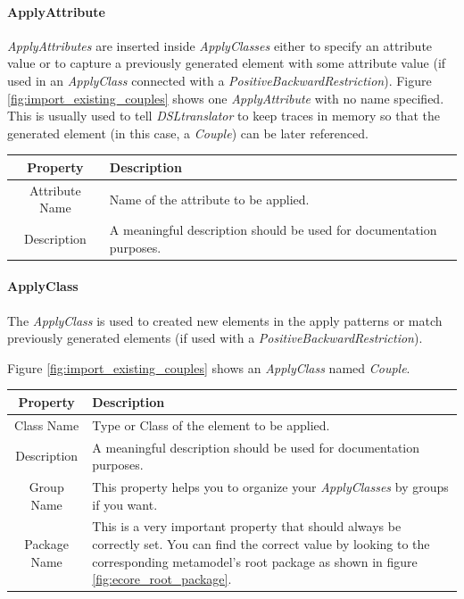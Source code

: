 \paragraph{ApplyAttribute}

\emph{ApplyAttributes} are inserted inside \emph{ApplyClasses} either to specify
an attribute value or to capture a previously generated element with some attribute
value (if used in an \emph{ApplyClass} connected with a
\emph{PositiveBackwardRestriction}). Figure \ref{fig:import_existing_couples}
shows one \emph{ApplyAttribute} with no name specified. This is usually used to
tell \emph{DSLtranslator} to keep traces in memory so that the generated element
(in this case, a \emph{Couple}) can be later referenced.

\begin{center}
  \begin{tabular}{ | c | p{\paragraphsize} | }
    \hline
    \textbf{Property} & \textbf{Description} \\ \hline
    Attribute Name & Name of the attribute to be applied.  \\ \hline
    Description & A meaningful description should be used for documentation
  purposes. \\ \hline
  \end{tabular}
\end{center}


\paragraph{ApplyClass}

The \emph{ApplyClass} is used to created new elements in the apply patterns or
match previously generated elements (if used with a
\emph{PositiveBackwardRestriction}).

Figure \ref{fig:import_existing_couples} shows an \emph{ApplyClass} named
\emph{Couple}.


\begin{center}
  \begin{tabular}{ | c | p{\paragraphsize} | }
    \hline
    \textbf{Property} & \textbf{Description} \\ \hline
    Class Name & Type or Class of the element to be applied.  \\ \hline
    Description & A meaningful description should be used for documentation
  purposes. \\ \hline
    Group Name & This property helps you to organize your \emph{ApplyClasses}
  by groups if you want.  \\ \hline
    Package Name & This is a very important property that should always be
  correctly set. You can find the
  correct value by looking to the corresponding metamodel's root package as
  shown in figure \ref{fig:ecore_root_package}. \\ \hline
  \end{tabular}
\end{center}

